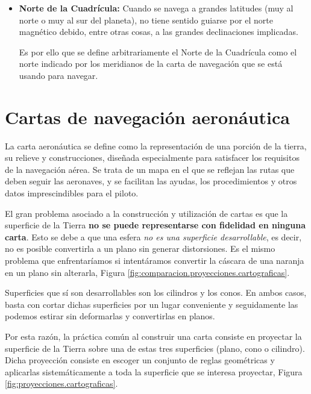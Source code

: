 \begin{itemize}
\item \textbf{Norte de la Cuadrícula:} Cuando se navega a grandes latitudes (muy al norte o muy al sur del planeta), no tiene sentido guiarse por el norte magnético debido, entre otras cosas, a las grandes declinaciones implicadas.

Es por ello que se define arbitrariamente el Norte de la Cuadrícula como el norte indicado por los meridianos de la carta de navegación que se está usando para navegar. 
\end{itemize}




\section{Cartas de navegaci\'on aeron\'autica}
\label{sec:cartas.navegacion.aeronautica}

La carta aeron\'autica se define como la representaci\'on de una porci\'on de la tierra, su relieve y construcciones, dise\~nada especialmente para satisfacer los requisitos de la navegaci\'on a\'erea. Se trata de un mapa en el que se reflejan las rutas que deben seguir las aeronaves, y se facilitan las ayudas, los procedimientos y otros datos imprescindibles para el piloto.

El gran problema asociado a la construcción y utilización de cartas es que la superficie de la Tierra \textbf{no se puede representarse con fidelidad en ninguna carta}. Esto se debe a que una esfera \emph{no es una superficie desarrollable}, es decir, no es posible convertirla a un plano sin generar distorsiones. Es el mismo problema que enfrentaríamos si intentáramos convertir la cáscara de una naranja en un plano sin alterarla, Figura \ref{fig:comparacion.proyecciones.cartograficas}. 

Superficies que sí son desarrollables son los cilindros y los conos. En ambos casos, basta con cortar dichas superficies por un lugar conveniente y seguidamente las podemos estirar sin deformarlas y convertirlas en planos.

Por esta razón, la práctica común al construir una carta consiste en proyectar la superficie de la Tierra sobre una de estas tres superficies (plano, cono o cilindro). Dicha proyección consiste en escoger un conjunto de reglas geométricas y aplicarlas sistemáticamente a toda la superficie que se interesa proyectar, Figura \ref{fig:proyecciones.cartograficas}.


